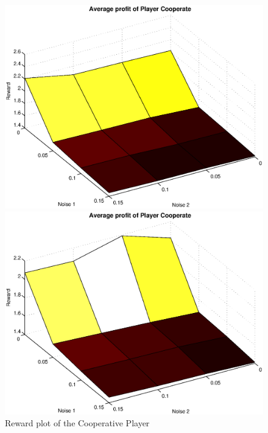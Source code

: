 \documentclass[11pt,twoside]{article}
\begin{document}
\begin{figure}[h]

\begin{minipage}[hbt]{0.65\textwidth}
	\centering
	\includegraphics[width=\textwidth]{pics/simulation1/Reward_vs_Noise_of_Player_Cooperate}
\end{minipage}
\hfill
\begin{minipage}[hbt]{0.3\textwidth}
	\centering
	\includegraphics[width=\textwidth]{pics/simulation2/Reward_vs_Noise_of_Player_Cooperate}
\end{minipage}
	\caption{Reward plot of the Cooperative Player}
	\label{Pic Cooperative Player}
\end{figure}
\end{document}

